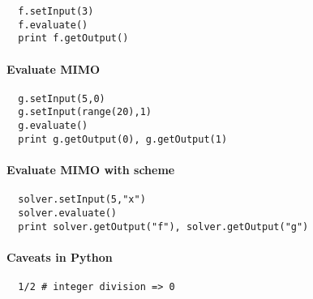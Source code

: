 \documentclass[a4paper,8pt]{article}
\begin{document}
\begin{multicols}{2}
\begin{verbatim}
  f.setInput(3)
  f.evaluate()
  print f.getOutput()
\end{verbatim}

\paragraph{Evaluate MIMO}
\begin{verbatim}
  g.setInput(5,0)
  g.setInput(range(20),1)
  g.evaluate()
  print g.getOutput(0), g.getOutput(1)
\end{verbatim}

\paragraph{Evaluate MIMO with scheme}
\begin{verbatim}
  solver.setInput(5,"x")
  solver.evaluate()
  print solver.getOutput("f"), solver.getOutput("g")
\end{verbatim}

\paragraph{Caveats in Python}
\begin{verbatim}
  1/2 # integer division => 0
\end{verbatim}
\end{multicols}
\end{document}
